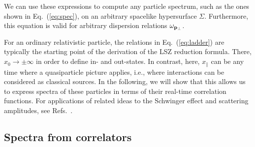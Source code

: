 \documentclass[reprint,superscriptaddress,english,preprintnumbers,amsmath,amssymb,aps,prx]{revtex4-2}
\def\Eq#1{Eq.~(\ref{#1})}
\begin{document}
We can use these expressions to compute any particle spectrum, such as the ones shown in \Eq{eq:spec}, on an arbitrary spacelike hypersurface $\Sigma$. Furthermore, this equation is valid for arbitrary dispersion relations $\omega_{\bold{p}_\perp}$.

For an ordinary relativistic particle, the relations in \Eq{eq:ladder} are typically the starting point of the derivation of the LSZ reduction formula. There, $x_0 \rightarrow \pm\infty$ in order to define in- and out-states. In contrast, here, $x_\parallel$ can be any time where a quasiparticle picture applies, i.e., where interactions can be considered as classical sources. In the following, we will show that this allows us to express spectra of these particles in terms of their real-time correlation functions. For applications of related ideas to the Schwinger effect and scattering amplitudes, see Refs.\ \cite{Fukushima:2014sia,Bulava:2019kbi}.





\subsection{Spectra from correlators}\label{sec:spec}
\end{document}
